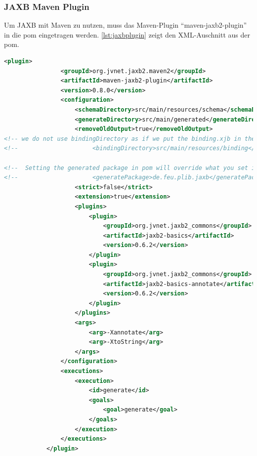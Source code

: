 \subsubsection{JAXB Maven Plugin}

Um JAXB mit \gls{Maven} zu nutzen, muss das \gls{Maven}-Plugin \enquote{maven-jaxb2-plugin} in die \gls{pom} eingetragen werden. \autoref{lst:jaxbplugin} zeigt den XML-Auschnitt aus der \gls{pom}. 

\begin{lstlisting}[caption=JAXB Maven Plugin, language=XML, label=lst:jaxbplugin]
            <plugin>
                <groupId>org.jvnet.jaxb2.maven2</groupId>
                <artifactId>maven-jaxb2-plugin</artifactId>
                <version>0.8.0</version>
                <configuration>
                    <schemaDirectory>src/main/resources/schema</schemaDirectory>
                    <generateDirectory>src/main/generated</generateDirectory>
                    <removeOldOutput>true</removeOldOutput>
<!-- we do not use bindingDirectory as if we put the binding.xjb in the schema directory it will be taken -->
<!--                     <bindingDirectory>src/main/resources/binding</bindingDirectory> -->

<!--  Setting the generated package in pom will override what you set in binding.xjb file, thus commented out -->
<!--                     <generatePackage>de.feu.plib.jaxb</generatePackage> -->
                    <strict>false</strict>
                    <extension>true</extension>
                    <plugins>
                        <plugin>
                            <groupId>org.jvnet.jaxb2_commons</groupId>
                            <artifactId>jaxb2-basics</artifactId>
                            <version>0.6.2</version>
                        </plugin>
                        <plugin>
                            <groupId>org.jvnet.jaxb2_commons</groupId>
                            <artifactId>jaxb2-basics-annotate</artifactId>
                            <version>0.6.2</version>
                        </plugin>
                    </plugins>
                    <args>
                        <arg>-Xannotate</arg>
                        <arg>-XtoString</arg>
                    </args>
                </configuration>
                <executions>
                    <execution>
                        <id>generate</id>
                        <goals>
                            <goal>generate</goal>
                        </goals>
                    </execution>
                </executions>
            </plugin>    
\end{lstlisting}

